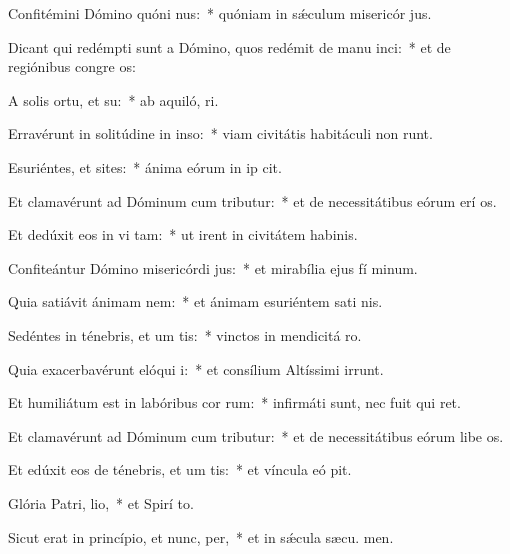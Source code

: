 \item Confitémini Dómino quóni nus:~* quóniam in sǽculum misericór jus.
\item Dicant qui redémpti sunt a Dómino, quos redémit de manu inci:~* et de regiónibus congre os:
\item A solis ortu, et su:~* ab aquiló,  ri.
\item Erravérunt in solitúdine in inso:~* viam civitátis habitáculi non runt.
\item Esuriéntes, et sites:~* ánima eórum in ip cit.
\item Et clamavérunt ad Dóminum cum tributur:~* et de necessitátibus eórum erí os.
\item Et dedúxit eos in vi tam:~* ut irent in civitátem habinis.
\item Confiteántur Dómino misericórdi jus:~* et mirabília ejus fí minum.
\item Quia satiávit ánimam nem:~* et ánimam esuriéntem sati nis.
\item Sedéntes in ténebris, et um tis:~* vinctos in mendicitá  ro.
\item Quia exacerbavérunt elóqui i:~* et consílium Altíssimi irrunt.
\item Et humiliátum est in labóribus cor rum:~* infirmáti sunt, nec fuit qui ret.
\item Et clamavérunt ad Dóminum cum tributur:~* et de necessitátibus eórum libe os.
\item Et edúxit eos de ténebris, et um tis:~* et víncula eó pit.
\item Glória Patri,  lio,~* et Spirí to.
\item Sicut erat in princípio, et nunc,  per,~* et in sǽcula sæcu. men.
